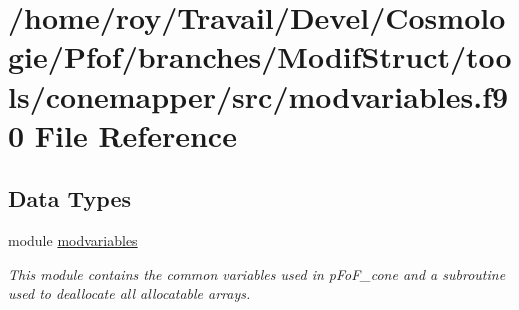 \hypertarget{tools_2conemapper_2src_2modvariables_8f90}{\section{/home/roy/\-Travail/\-Devel/\-Cosmologie/\-Pfof/branches/\-Modif\-Struct/tools/conemapper/src/modvariables.f90 File Reference}
\label{tools_2conemapper_2src_2modvariables_8f90}
}
\subsection*{Data Types}
\begin{DoxyCompactItemize}
\item 
module \hyperlink{classmodvariables}{modvariables}
\begin{DoxyCompactList}\small\item\em This module contains the common variables used in p\-Fo\-F\-\_\-cone and a subroutine used to deallocate all allocatable arrays. \end{DoxyCompactList}\end{DoxyCompactItemize}
